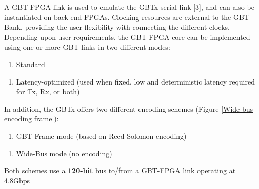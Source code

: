 A GBT-FPGA link is used to emulate the GBTx serial link [3], and can also be instantiated on back-end FPGAs. Clocking resources are external to the GBT Bank, providing the user flexibility with connecting the different clocks. Depending upon user requirements, the GBT-FPGA core can be implemented using one or more GBT links in two different modes:
\begin{enumerate}
\item Standard 
\end{enumerate}
\begin{enumerate}
\item Latency-optimized (used when fixed, low and deterministic latency required for Tx, Rx, or both)
\end{enumerate}
In addition, the GBTx offers two different encoding schemes (Figure \ref{Wide-bus encoding frame}):
\begin{enumerate}
\item GBT-Frame mode (based on Reed-Solomon encoding)
\end{enumerate}
\begin{enumerate}
\item Wide-Bus mode (no encoding)
\end{enumerate}
Both schemes use a \textbf{120-bit} bus to/from a GBT-FPGA link operating at 4.8Gbps
